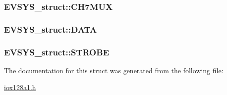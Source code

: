 \label{struct_e_v_s_y_s__struct_ab048af0804385494b234cadff67a7688}
\hypertarget{struct_e_v_s_y_s__struct_ab4be597a375669e49b5c71dad4bacdb4}{
\subsubsection[{CH7MUX}]{ {\bf EVSYS\_\-struct::CH7MUX}}}
\label{struct_e_v_s_y_s__struct_ab4be597a375669e49b5c71dad4bacdb4}
\hypertarget{struct_e_v_s_y_s__struct_a2dd9ba824719e8959c62b86dcdc6cc8e}{
\subsubsection[{DATA}]{ {\bf EVSYS\_\-struct::DATA}}}
\label{struct_e_v_s_y_s__struct_a2dd9ba824719e8959c62b86dcdc6cc8e}
\hypertarget{struct_e_v_s_y_s__struct_abc3e19950a6bf0ba4bc3a6b53bd1e517}{
\subsubsection[{STROBE}]{ {\bf EVSYS\_\-struct::STROBE}}}
\label{struct_e_v_s_y_s__struct_abc3e19950a6bf0ba4bc3a6b53bd1e517}


The documentation for this struct was generated from the following file:\begin{DoxyCompactItemize}
\item 
\hyperlink{iox128a1_8h}{iox128a1.h}\end{DoxyCompactItemize}
